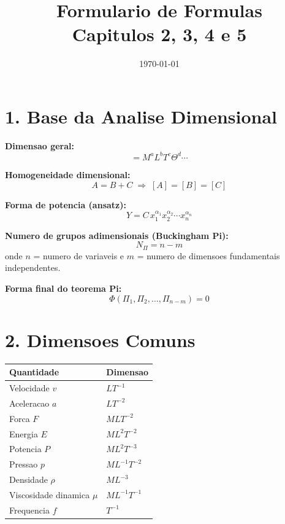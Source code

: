 \documentclass[12pt,a4paper]{article}
\title{Formulario de Formulas\\Capitulos 2, 3, 4 e 5}
\author{}
\date{\today}
\begin{document}
\maketitle

\section*{1. Base da Analise Dimensional}

\textbf{Dimensao geral:}
\begin{equation}
[Q] = M^a L^b T^c \Theta^d \cdots
\end{equation}

\textbf{Homogeneidade dimensional:}
\begin{equation}
A = B + C \;\Rightarrow\; [A]=[B]=[C]
\end{equation}

\textbf{Forma de potencia (ansatz):}
\begin{equation}
Y = C\,x_1^{\alpha_1}x_2^{\alpha_2}\cdots x_n^{\alpha_n}
\end{equation}

\textbf{Numero de grupos adimensionais (Buckingham Pi):}
\begin{equation}
N_\Pi = n - m
\end{equation}
onde $n$ = numero de variaveis e $m$ = numero de dimensoes fundamentais independentes.

\textbf{Forma final do teorema Pi:}
\begin{equation}
\Phi(\Pi_1,\Pi_2,\ldots,\Pi_{n-m})=0
\end{equation}

\section*{2. Dimensoes Comuns}
\begin{center}
\begin{tabular}{ll}
\toprule
Quantidade & Dimensao \\
\midrule
Velocidade $v$ & $LT^{-1}$ \\
Aceleracao $a$ & $LT^{-2}$ \\
Forca $F$ & $MLT^{-2}$ \\
Energia $E$ & $ML^2T^{-2}$ \\
Potencia $P$ & $ML^2T^{-3}$ \\
Pressao $p$ & $ML^{-1}T^{-2}$ \\
Densidade $\rho$ & $ML^{-3}$ \\
Viscosidade dinamica $\mu$ & $ML^{-1}T^{-1}$ \\
Frequencia $f$ & $T^{-1}$ \\
\bottomrule
\end{tabular}
\end{center}
\end{document}
